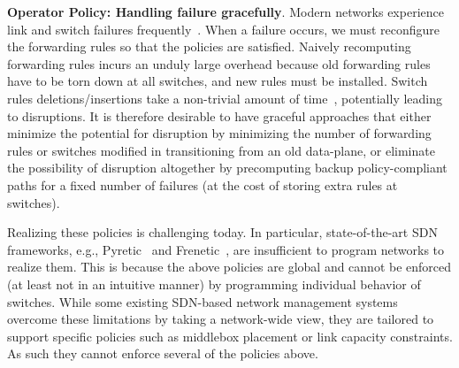 \begin{compactitemize}
 
 \item \textbf{Operator Policy: Handling failure gracefully}. Modern
   networks experience link and switch failures frequently~\cite{datacenterfailures}.
   When a failure occurs, we must reconfigure the forwarding rules
   so that the policies are satisfied. Naively recomputing
   forwarding rules incurs an unduly large overhead because old
   forwarding rules have to be torn down at all switches, and new
   rules must be installed. Switch rules deletions/insertions take a
   non-trivial amount of time~\cite{sdnlatency}, potentially
   leading to disruptions. It is therefore desirable to have graceful
   approaches that either minimize the potential for disruption by
   minimizing the number of forwarding rules or switches modified in
   transitioning from an old data-plane, or eliminate the possibility
   of disruption altogether by precomputing backup policy-compliant
   paths for a fixed number of failures (at the cost of storing extra
   rules at switches).
   
\end{compactitemize}


\noindent Realizing these policies  is challenging today.
In particular, state-of-the-art SDN frameworks, e.g., Pyretic~\cite{pyretic}
and Frenetic~\cite{frenetic}, are insufficient to program networks to realize
them.  This is because the above policies are global and
cannot be enforced (at least not in an intuitive manner) by
programming individual behavior of switches.  While some existing
SDN-based network management systems~\cite{simple,merlin,oneswitch}
overcome these limitations by taking a network-wide view, they are
tailored to support specific policies such as middlebox placement or
link capacity constraints. As such they cannot enforce several of the
policies above.


